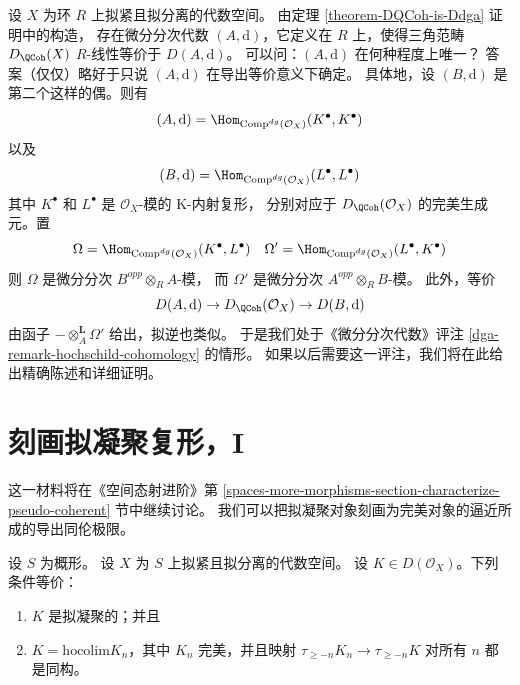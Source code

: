 \begin{remark}[微分分次代数的唯一性]
\label{remark-independence-choice}
设 $X$ 为环 $R$ 上拟紧且拟分离的代数空间。
由定理 \ref{theorem-DQCoh-is-Ddga} 证明中的构造，
存在微分分次代数 $(A, \text{d})$，它定义在 $R$ 上，使得三角范畴
$D_\QCoh(X)$ $R$-线性等价于 $D(A, \text{d})$。
可以问：$(A, \text{d})$ 在何种程度上唯一？
答案（仅仅）略好于只说 $(A, \text{d})$ 在导出等价意义下确定。
具体地，设 $(B, \text{d})$ 是第二个这样的偶。则有
$$
(A, \text{d}) = \Hom_{\text{Comp}^{dg}(\mathcal{O}_X)}(K^\bullet, K^\bullet)
$$
以及
$$
(B, \text{d}) = \Hom_{\text{Comp}^{dg}(\mathcal{O}_X)}(L^\bullet, L^\bullet)
$$
其中 $K^\bullet$ 和 $L^\bullet$ 是 $\mathcal{O}_X$-模的 K-内射复形，
分别对应于 $D_\QCoh(\mathcal{O}_X)$ 的完美生成元。置
$$
\Omega = \Hom_{\text{Comp}^{dg}(\mathcal{O}_X)}(K^\bullet, L^\bullet)
\quad
\Omega' = \Hom_{\text{Comp}^{dg}(\mathcal{O}_X)}(L^\bullet, K^\bullet)
$$
则 $\Omega$ 是微分分次 $B^{opp} \otimes_R A$-模，
而 $\Omega'$ 是微分分次 $A^{opp} \otimes_R B$-模。
此外，等价
$$
D(A, \text{d}) \to D_\QCoh(\mathcal{O}_X) \to
D(B, \text{d})
$$
由函子 $- \otimes_A^\mathbf{L} \Omega'$ 给出，拟逆也类似。
于是我们处于《微分分次代数》评注
\ref{dga-remark-hochschild-cohomology} 的情形。
如果以后需要这一评注，我们将在此给出精确陈述和详细证明。
\end{remark}











\section{刻画拟凝聚复形，I}
\label{section-pseudo-coherent-hocolim}

\noindent
这一材料将在《空间态射进阶》第
\ref{spaces-more-morphisms-section-characterize-pseudo-coherent} 节中继续讨论。
我们可以把拟凝聚对象刻画为完美对象的逼近所成的导出同伦极限。

\begin{lemma}
\label{lemma-pseudo-coherent-hocolim}
设 $S$ 为概形。
设 $X$ 为 $S$ 上拟紧且拟分离的代数空间。
设 $K \in D(\mathcal{O}_X)$。下列条件等价：
\begin{enumerate}
\item $K$ 是拟凝聚的；并且
\item $K = \text{hocolim} K_n$，其中
$K_n$ 完美，并且映射
$\tau_{\geq -n}K_n \to \tau_{\geq -n}K$ 对所有 $n$ 都是同构。
\end{enumerate}
\end{lemma}

